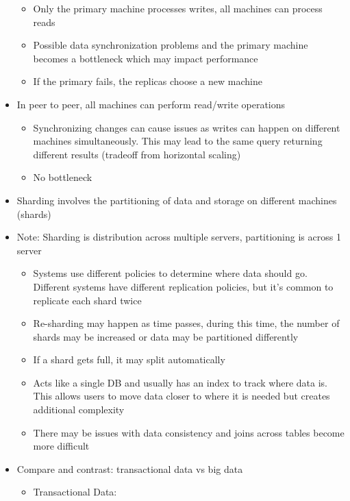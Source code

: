 \documentclass[8pt,landscape,a4paper, fleqn, dvipsnames]{extarticle}
\begin{document}
\begin{multicols*}{4}
\begin{itemize}
    \begin{itemize}
        \item Only the primary machine processes writes, all machines can process reads
        \item Possible data synchronization problems and the primary machine becomes a bottleneck which may impact performance
        \item If the primary fails, the replicas choose a new machine
    \end{itemize}
    \item In peer to peer, all machines can perform read/write operations
    \begin{itemize}
        \item Synchronizing changes can cause issues as writes can happen on different machines simultaneously. This may lead to the same query returning different results (tradeoff from horizontal scaling)
        \item No bottleneck
    \end{itemize}
    \item Sharding involves the partitioning of data and storage on different machines (shards)
    \item Note: Sharding is distribution across multiple servers, partitioning is across 1 server
    \begin{itemize}
        \item Systems use different policies to determine where data should go. Different systems have different replication policies, but it's common to replicate each shard twice
        \item Re-sharding may happen as time passes, during this time, the number of shards may be increased or data may be partitioned differently
        \item If a shard gets full, it may split automatically
        \item Acts like a single DB and usually has an index to track where data is. This allows users to move data closer to where it is needed but creates additional complexity
        \item There may be issues with data consistency and joins across tables become more difficult
    \end{itemize}
    \item Compare and contrast: transactional data vs big data
    \begin{itemize}
        \item Transactional Data:
        \begin{itemize}

\end{itemize}
\end{itemize}
\end{itemize}
\end{multicols*}
\end{document}
